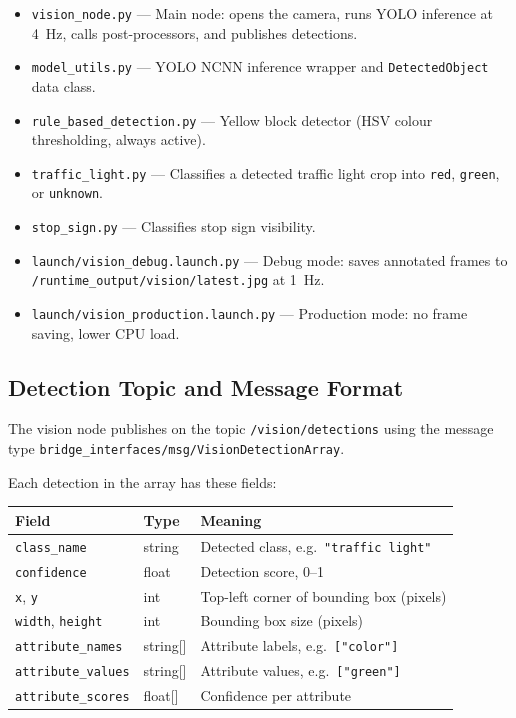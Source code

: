 \documentclass{ol-softwaremanual}
\begin{document}
\begin{itemize}
  \item \texttt{vision\_node.py} --- Main node: opens the camera, runs YOLO
        inference at 4~Hz, calls post-processors, and publishes detections.
  \item \texttt{model\_utils.py} --- YOLO NCNN inference wrapper and
        \texttt{DetectedObject} data class.
  \item \texttt{rule\_based\_detection.py} --- Yellow block detector (HSV colour
        thresholding, always active).
  \item \texttt{traffic\_light.py} --- Classifies a detected traffic light
        crop into \texttt{red}, \texttt{green}, or \texttt{unknown}.
  \item \texttt{stop\_sign.py} --- Classifies stop sign visibility.
  \item \texttt{launch/vision\_debug.launch.py} --- Debug mode: saves annotated
        frames to \texttt{/runtime\_output/vision/latest.jpg} at 1~Hz.
  \item \texttt{launch/vision\_production.launch.py} --- Production mode: no
        frame saving, lower CPU load.
\end{itemize}

\subsection{Detection Topic and Message Format}

The vision node publishes on the topic \texttt{/vision/detections}
using the message type
\texttt{bridge\_interfaces\allowbreak/msg\allowbreak/VisionDetectionArray}.

Each detection in the array has these fields:

\begin{center}
\begin{tabular}{lll}
\hline
\textbf{Field} & \textbf{Type} & \textbf{Meaning} \\
\hline
\texttt{class\_name} & string & Detected class, e.g.\ \texttt{"traffic light"} \\
\texttt{confidence}  & float  & Detection score, 0--1 \\
\texttt{x}, \texttt{y} & int  & Top-left corner of bounding box (pixels) \\
\texttt{width}, \texttt{height} & int & Bounding box size (pixels) \\
\texttt{attribute\_names} & string[] & Attribute labels, e.g.\ \texttt{["color"]} \\
\texttt{attribute\_values} & string[] & Attribute values, e.g.\ \texttt{["green"]} \\
\texttt{attribute\_scores} & float[]  & Confidence per attribute \\
\hline
\end{tabular}
\end{center}
\end{document}
